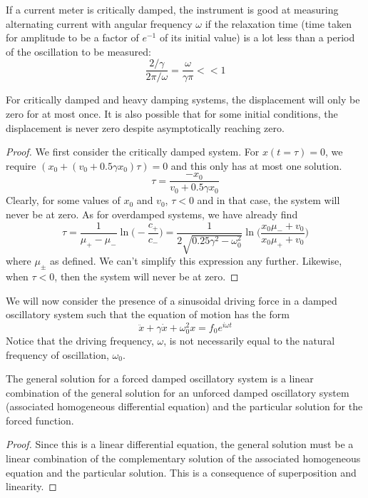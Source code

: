 \documentclass[a4paper]{article}
\begin{document}
\begin{eg}
If a current meter is critically damped, the instrument is good at measuring alternating current with angular frequency $\omega$ if the relaxation time (time taken for amplitude to be a factor of $e^{-1}$ of its initial value) is a lot less
than a period of the oscillation to be measured:
$$\frac{2/\gamma}{2\pi/\omega}=\frac{\omega}{\gamma\pi}<<1$$
\end{eg}
\begin{cor}
For critically damped and heavy damping systems, the displacement will only be zero for at most once. It is also possible that for some initial conditions, the displacement is never zero despite asymptotically reaching zero.
\end{cor}
\begin{proof}
We first consider the critically damped system. For $x(t=\tau)=0$, we require $(x_0+(v_0+0.5\gamma x_0)\tau)=0$ and this only has at most one solution.
$$\tau=\frac{-x_0}{v_0+0.5\gamma x_0}$$
Clearly, for some values of $x_0$ and $v_0$, $\tau<0$ and in that case, the system will never be at zero. As for overdamped systems, we have already find
$$\tau=\frac{1}{\mu_+-\mu_-}\ln\bigg(-\frac{c_+}{c_-}\bigg)=\frac{1}{2\sqrt{0.25\gamma^2-\omega_0^2}}\ln\bigg(\frac{x_0\mu_-+v_0}{x_0\mu_++v_0}\bigg)$$
where $\mu_\pm$ as defined. We can't simplify this expression any further. Likewise, when $\tau<0$, then the system will never be at zero.
\end{proof}
\begin{defi}
We will now consider the presence of a sinusoidal driving force in a damped oscillatory system such that the equation of motion has the form
$$\ddot{x}+\gamma\dot{x}+\omega_0^2x=f_0e^{i\omega t}$$
Notice that the driving frequency, $\omega$, is not necessarily equal to the natural frequency of oscillation, $\omega_0$.
\end{defi}
\begin{thm}
The general solution for a forced damped oscillatory system is a linear combination of the general solution for an unforced damped oscillatory system (associated homogeneous differential equation) and the particular solution for the forced function.
\end{thm}
\begin{proof}
Since this is a linear differential equation, the general solution must be a linear combination of the complementary solution of the associated homogeneous equation and the particular solution. This is a consequence of superposition and linearity.
\end{proof}
\end{document}
